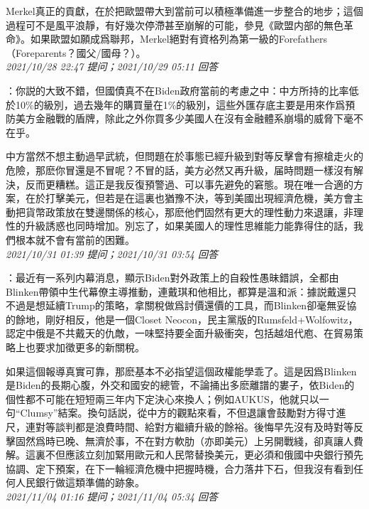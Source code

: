 \documentclass[twocolumn]{ctexart}
\begin{document}
Merkel真正的貢獻，在於把歐盟帶大到當前可以積極準備進一步整合的地步；這個過程可不是風平浪靜，有好幾次停滯甚至崩解的可能，參見《歐盟内部的無色革命》。如果歐盟如願成爲聯邦，Merkel絕對有資格列為第一級的Forefathers（Foreparents？國父/國母？）。
\\

\textit{\hfill\noindent\small 2021/10/28 22:47 提问；2021/10/29 05:11 回答}

：你説的大致不錯，但國債真不在Biden政府當前的考慮之中：中方所持的比率低於10\%的級別，過去幾年的購買量在1\%的級別，這些外匯存底主要是用來作爲預防美方金融戰的盾牌，除此之外你買多少美國人在沒有金融體系崩塌的威脅下毫不在乎。

中方當然不想主動過早武統，但問題在於事態已經升級到對等反擊會有擦槍走火的危險，那麽你冒還是不冒呢？不冒的話，美方必然又再升級，届時問題一樣沒有解決，反而更糟糕。這正是我反復預警過、可以事先避免的窘態。現在唯一合適的方案，在於打擊美元，但若是在這裏也猶豫不決，等到美國出現經濟危機，美方會主動把貨幣政策放在雙邊關係的核心，那麽他們固然有更大的理性動力來退讓，非理性的升級誘惑也同時增加。別忘了，如果美國人的理性思維能力能靠得住的話，我們根本就不會有當前的困難。
\\

\textit{\hfill\noindent\small 2021/10/31 01:39 提问；2021/10/31 03:54 回答}

：最近有一系列内幕消息，顯示Biden對外政策上的自殺性愚昧錯誤，全都由Blinken帶領中生代幕僚主導推動，連戴琪和他相比，都算是溫和派：據説戴還只不過是想延續Trump的策略，拿關稅做爲討價還價的工具，而Blinken卻毫無妥協的餘地，剛好相反，他是一個Closet Neocon，民主黨版的Rumsfeld+Wolfowitz，認定中俄是不共戴天的仇敵，一味堅持要全面升級衝突，包括越俎代庖、在貿易策略上也要求加徵更多的新關稅。

如果這個報導真實可靠，那麽基本不必指望這個政權能學乖了。這是因爲Blinken是Biden的長期心腹，外交和國安的總管，不論捅出多麽離譜的婁子，依Biden的個性都不可能在短短兩三年内下定決心來換人；例如AUKUS，他就只以一句“Clumsy”結案。換句話説，從中方的觀點來看，不但退讓會鼓勵對方得寸進尺，連對等談判都是浪費時間、給對方繼續升級的餘裕。後悔早先沒有及時對等反擊固然爲時已晚、無濟於事，不在對方軟肋（亦即美元）上另開戰綫，卻真讓人費解。這裏不但應該立刻加緊用歐元和人民幣替換美元，更必須和俄國中央銀行預先協調、定下預案，在下一輪經濟危機中把握時機，合力落井下石，但我沒有看到任何人民銀行做這類準備的跡象。
\\

\textit{\hfill\noindent\small 2021/11/04 01:16 提问；2021/11/04 05:34 回答}
\end{document}

